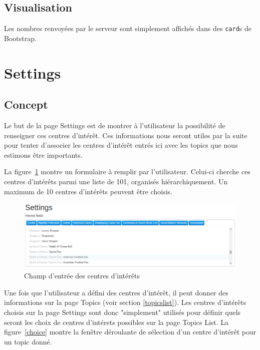 	\subsection{Visualisation}

		Les nombres renvoyées par le serveur sont simplement affichés dans des \texttt{card}s de Bootstrap.

\clearpage

%
%
%
%

\section{Settings}

	\subsection{Concept}

		Le but de la page Settings est de montrer à l'utilisateur la possibilité de renseigner ces centres d'intérêt. Ces informations nous seront utiles par la suite pour tenter d'associer les centres d'intérêt entrés ici avec les topics que nous estimons être importants.

		La figure~\ref{settings_image} montre un formulaire à remplir par l'utilisateur. Celui-ci cherche ces centres d'intérêts parmi une liste de 101, organisés hiérarchiquement. Un maximum de 10 centres d'intérêts peuvent être choisis.

		\begin{figure}[!h]
			\centering
			\includegraphics[height=0.32\textwidth]{images/design/pages/settings}
			\caption{Champ d'entrée des centres d'intérêts}
			\label{settings_image}
		\end{figure}

		Une fois que l'utilisateur a défini des centres d'intérêt, il peut donner des informations sur la page Topics (voir section \ref{topicslist}). Les centres d'intérêts choisis sur la page Settings sont donc "simplement" utilisés pour définir quels seront les choix de centres d'intérets possibles sur la page Topics List. La figure~\ref{choice} montre la fenêtre déroulante de sélection d'un centre d'intérêt pour un topic donné.

